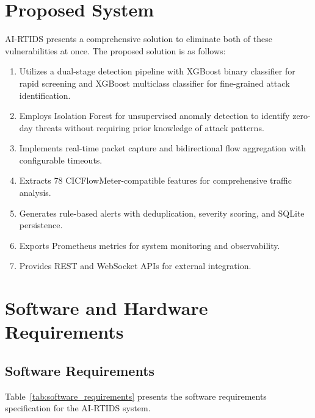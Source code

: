 \documentclass[12pt,a4paper]{report}
\begin{document}
\section{Proposed System}

AI-RTIDS presents a comprehensive solution to eliminate both of these vulnerabilities at once. The proposed solution is as follows:

\begin{enumerate}
    \item Utilizes a dual-stage detection pipeline with XGBoost binary classifier for rapid screening and XGBoost multiclass classifier for fine-grained attack identification.

    \item Employs Isolation Forest for unsupervised anomaly detection to identify zero-day threats without requiring prior knowledge of attack patterns.

    \item Implements real-time packet capture and bidirectional flow aggregation with configurable timeouts.

    \item Extracts 78 CICFlowMeter-compatible features for comprehensive traffic analysis.

    \item Generates rule-based alerts with deduplication, severity scoring, and SQLite persistence.

    \item Exports Prometheus metrics for system monitoring and observability.

    \item Provides REST and WebSocket APIs for external integration.
\end{enumerate}

\section{Software and Hardware Requirements}

\subsection{Software Requirements}

Table~\ref{tab:software_requirements} presents the software requirements specification for the AI-RTIDS system.
\end{document}
